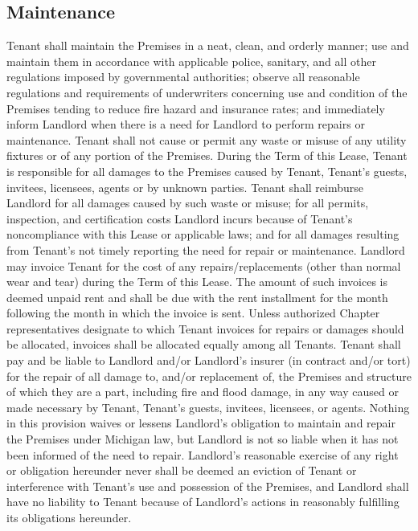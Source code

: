 \documentclass{article}
\begin{document}
\subsection{Maintenance}
Tenant shall maintain the Premises in a neat, clean, and orderly manner; use and
maintain them in accordance with applicable police, sanitary, and all other
regulations imposed by governmental authorities; observe all reasonable
regulations and requirements of underwriters concerning use and condition of the
Premises tending to reduce fire hazard and insurance rates; and immediately
inform Landlord when there is a need for Landlord to perform repairs or
maintenance. Tenant shall not cause or permit any waste or misuse of any utility
fixtures or of any portion of the Premises. During the Term of this Lease,
Tenant is responsible for all damages to the Premises caused by Tenant, Tenant’s
guests, invitees, licensees, agents or by unknown parties. Tenant shall
reimburse Landlord for all damages caused by such waste or misuse; for all
permits, inspection, and certification costs Landlord incurs because of Tenant’s
noncompliance with this Lease or applicable laws; and for all damages resulting
from Tenant’s not timely reporting the need for repair or maintenance. Landlord
may invoice Tenant for the cost of any repairs\slash{}replacements (other than
normal wear and tear) during the Term of this Lease. The amount of such invoices
is deemed unpaid rent and shall be due with the rent installment for the month
following the month in which the invoice is sent. Unless authorized Chapter
representatives designate to which Tenant invoices for repairs or damages should
be allocated, invoices shall be allocated equally among all Tenants. Tenant
shall pay and be liable to Landlord and/or Landlord’s insurer (in contract
and/or tort) for the repair of all damage to, and/or replacement of, the
Premises and structure of which they are a part, including fire and flood
damage, in any way caused or made necessary by Tenant, Tenant’s guests,
invitees, licensees, or agents. Nothing in this provision waives or lessens
Landlord’s obligation to maintain and repair the Premises under Michigan law,
but Landlord is not so liable when it has not been informed of the need to
repair. Landlord’s reasonable exercise of any right or obligation hereunder
never shall be deemed an eviction of Tenant or interference with Tenant’s use
and possession of the Premises, and Landlord shall have no liability to Tenant
because of Landlord’s actions in reasonably fulfilling its obligations
hereunder.
\end{document}
